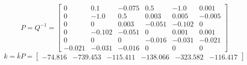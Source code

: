 \begin{equation}
  P = Q^{-1} = \left[\begin{matrix}0 & 0.1 & -0.075 & 0.5 & -1.0 & 0.001\\0 & -1.0 & 0.5 & 0.003 & 0.005 & -0.005\\0 & 0 & 0.003 & -0.051 & -0.102 & 0\\0 & -0.102 & -0.051 & 0 & 0.001 & 0.001\\0 & 0 & 0 & -0.016 & -0.031 & -0.021\\-0.021 & -0.031 & -0.016 & 0 & 0 & 0\end{matrix}\right]
\end{equation}
\begin{equation}
  k = \bar k P = \left[\begin{matrix}-74.816 & -739.453 & -115.411 & -138.066 & -323.582 & -116.417\end{matrix}\right]
\end{equation}
